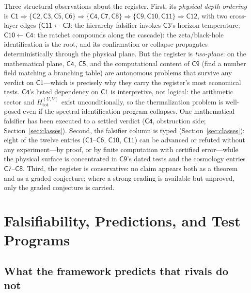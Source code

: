 \documentclass[11pt,a4paper]{article}
\theoremstyle{plain}
\theoremstyle{definition}
\theoremstyle{remark}
\begin{document}
Three structural observations about the register. First, its \emph{physical depth ordering}
is
$\mathsf{C1}\Rightarrow\{\mathsf{C2},\mathsf{C3},\mathsf{C5},\mathsf{C6}\}\Rightarrow
\{\mathsf{C4},\mathsf{C7},\mathsf{C8}\}\Rightarrow\{\mathsf{C9},\mathsf{C10},
\mathsf{C11}\}\Rightarrow\mathsf{C12}$, with two cross-layer edges
($\mathsf{C11}\leftarrow\mathsf{C3}$: the hierarchy falsifier invokes $\mathsf{C3}$'s horizon
temperature; $\mathsf{C10}\leftarrow\mathsf{C4}$: the ratchet compounds along the cascade):
the zeta/black-hole identification is the root, and its confirmation or collapse propagates
deterministically through the physical plane. But the register is \emph{two-plane}: on the
mathematical plane, $\mathsf{C4}$, $\mathsf{C5}$, and the computational content of
$\mathsf{C9}$ (find a number field matching a branching table) are autonomous problems
that survive any verdict on $\mathsf{C1}$---which is precisely why they carry the register's
most economical tests. $\mathsf{C4}$'s listed dependency on $\mathsf{C1}$ is interpretive, not
logical: the arithmetic sector and $H_{\mathrm{tot}}^{(U,V)}$ exist unconditionally, so the
thermalization problem is well-posed even if the spectral-identification program collapses.
One mathematical falsifier has been executed to a settled verdict
($\mathsf{C4}$, obstruction side; Section~\ref{sec:classes}).
Second, the falsifier column is typed (Section~\ref{sec:classes}): eight of the twelve
entries ($\mathsf{C1}$--$\mathsf{C6}$, $\mathsf{C10}$, $\mathsf{C11}$) can be advanced or
refuted without any experiment---by proof, or by finite computation with certified
error---while the physical surface is concentrated in $\mathsf{C9}$'s dated tests and the
cosmology entries $\mathsf{C7}$--$\mathsf{C8}$. Third, the register is conservative: no claim appears both as a theorem and as
a graded conjecture; where a strong reading is available but unproved, only the graded
conjecture is carried.

\section{Falsifiability, Predictions, and Test Programs}\label{sec:falsify}

\subsection{What the framework predicts that rivals do not}
\end{document}
